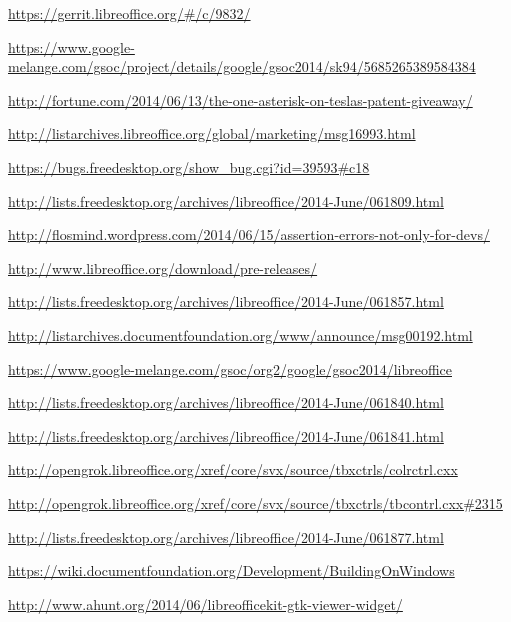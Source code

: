 \documentclass{article}
\begin{document}
\begin{thebibliography}{30}
    \url{https://gerrit.libreoffice.org/#/c/9832/}

    \url{https://www.google-melange.com/gsoc/project/details/google/gsoc2014/sk94/5685265389584384}

    \url{http://fortune.com/2014/06/13/the-one-asterisk-on-teslas-patent-giveaway/}

    \url{http://listarchives.libreoffice.org/global/marketing/msg16993.html}

    \url{https://bugs.freedesktop.org/show_bug.cgi?id=39593#c18}

    \url{http://lists.freedesktop.org/archives/libreoffice/2014-June/061809.html}

    \url{http://flosmind.wordpress.com/2014/06/15/assertion-errors-not-only-for-devs/}

    \url{http://www.libreoffice.org/download/pre-releases/}

    \url{http://lists.freedesktop.org/archives/libreoffice/2014-June/061857.html}

    \url{http://listarchives.documentfoundation.org/www/announce/msg00192.html}

    \url{https://www.google-melange.com/gsoc/org2/google/gsoc2014/libreoffice}

    \url{http://lists.freedesktop.org/archives/libreoffice/2014-June/061840.html}

    \url{http://lists.freedesktop.org/archives/libreoffice/2014-June/061841.html}

    \url{http://opengrok.libreoffice.org/xref/core/svx/source/tbxctrls/colrctrl.cxx}

    \url{http://opengrok.libreoffice.org/xref/core/svx/source/tbxctrls/tbcontrl.cxx#2315}

    \url{http://lists.freedesktop.org/archives/libreoffice/2014-June/061877.html}

    \url{https://wiki.documentfoundation.org/Development/BuildingOnWindows}

    \url{http://www.ahunt.org/2014/06/libreofficekit-gtk-viewer-widget/}


\end{thebibliography}
\end{document}

